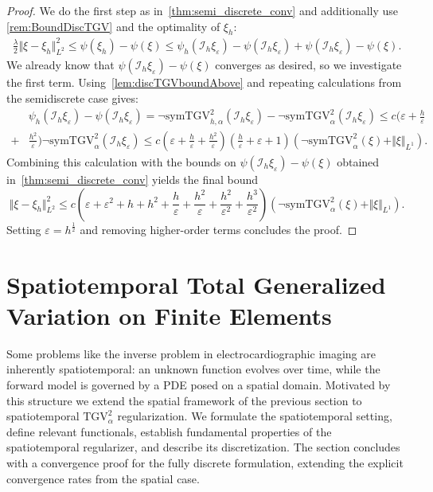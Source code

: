 \documentclass{article}
\newcommand{\TGV}{\mathrm{TGV}}
\newcommand{\NSymTGV}{\neg \mathrm{symTGV}}
\begin{document}
	\begin{proof}
		We do the first step as in~\cref{thm:semi_discrete_conv} and additionally use \cref{rem:BoundDiscTGV} and the optimality of $\xi_{h}$:
		\begin{align*}
			\frac{\lambda}{2}\Vert \xi - \xi_{h}\Vert_{L^2}^2 \leq \psi(\xi_{h}) - \psi(\xi) \leq  \psi_h(\mathcal{I}_h\xi_\varepsilon) - \psi(\mathcal{I}_h\xi_\varepsilon) + \psi(\mathcal{I}_h\xi_\varepsilon) - \psi(\xi).
		\end{align*}
		We already know that $\psi(\mathcal{I}_h\xi_\varepsilon) - \psi(\xi)$ converges as desired, so we investigate the first term.
		Using~\cref{lem:discTGVboundAbove} and repeating calculations from the semidiscrete case gives:
		\begin{align*}
			&\psi_h(\mathcal{I}_h\xi_\varepsilon) - \psi(\mathcal{I}_h\xi_\varepsilon) = \NSymTGV_{h,\alpha}^2(\mathcal{I}_h\xi_\varepsilon) - \NSymTGV_{\alpha}^2(\mathcal{I}_h\xi_\varepsilon)
			\leq c(\varepsilon + \frac{h}{\varepsilon} \\+& \frac{h^2}{\varepsilon})\NSymTGV_{\alpha}^2(\mathcal{I}_h\xi_\varepsilon)
			\leq c (\varepsilon + \frac{h}{\varepsilon} + \frac{h^2}{\varepsilon})(\frac{h}{\varepsilon} + \varepsilon + 1)(\NSymTGV^2_{\alpha}(\xi) + \Vert \xi\Vert_{L^1}).
		\end{align*}
		Combining this calculation with the bounds on $\psi(\mathcal{I}_h\xi_\varepsilon) - \psi(\xi)$ obtained in~\cref{thm:semi_discrete_conv} yields the final bound
		\begin{equation*}
			\Vert \xi - \xi_{h}\Vert_{L^2}^2 \leq c\left( \varepsilon + \varepsilon^2 + h + h^2 + \frac{h}{\varepsilon} + \frac{h^2}{\varepsilon} + \frac{h^2}{\varepsilon^2} +\frac{h^3}{\varepsilon^2}  \right)\left(\NSymTGV^2_{\alpha}(\xi) + \Vert \xi\Vert_{L^1}\right).
		\end{equation*}
		Setting $\varepsilon = h^\frac{1}{2}$ and removing higher-order terms concludes the proof.
	\end{proof}
	
	\section{Spatiotemporal Total Generalized Variation on Finite Elements}
	\label{sec:SpaceTimeReg}
	Some problems like the inverse problem in electrocardiographic imaging are inherently spatiotemporal: an unknown function evolves over time, while the forward model is governed by a PDE posed on a spatial domain.
	Motivated by this structure we extend the spatial framework of the previous section to spatiotemporal $\TGV_\alpha^2$ regularization.
	We formulate the spatiotemporal setting, define relevant functionals, establish fundamental properties of the spatiotemporal regularizer, and describe its discretization.
	The section concludes with a convergence proof for the fully discrete formulation, extending the explicit convergence rates from the spatial case.
	
\end{document}
